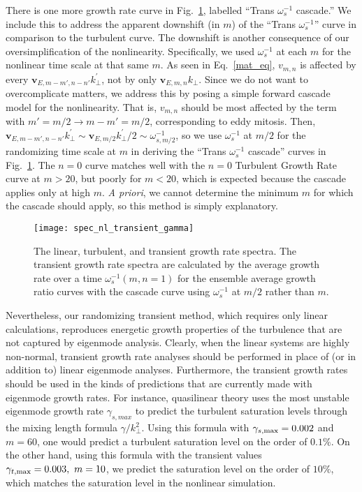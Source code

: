 \documentclass[showpacs,preprintnumbers,amsmath,amssymb,superscriptaddress,aip]{revtex4-1}
\begin{document}
There is one more growth rate curve in Fig.~\ref{spec_nl_transient_gamma}, labelled ``Trans $\omega_s^{-1}$ cascade.'' We include this to address the apparent downshift (in $m$) of
the ``Trans $\omega_s^{-1}$'' curve in comparison to the turbulent curve. The downshift is another consequence of our oversimplification of the nonlinearity. Specifically, we
used $\omega_s^{-1}$ at each $m$ for the nonlinear time scale at that same $m$. As seen in Eq.~\ref{mat_eq}, $v_{m,n}$ is affected by every $\mathbf{v}_{E,m-m',n-n'} k^{'}_\perp$, not by only
$\mathbf{v}_{E,m,n} k_\perp$. Since we do not want to overcomplicate matters, we address this by posing a simple forward cascade model for the nonlinearity. That is, $v_{m,n}$ should be
most affected by the term with $m' = m/2 \rightarrow m-m' = m/2$, corresponding to eddy mitosis. Then, $\mathbf{v}_{E,m-m',n-n'} k^{'}_\perp \sim \mathbf{v}_{E,m/2} k^{'}_\perp/2 \sim \omega_{s,m/2}^{-1}$, 
so we use $\omega_s^{-1}$ at $m/2$ for the randomizing time scale at $m$ in deriving the ``Trans $\omega_s^{-1}$ cascade'' curves in Fig.~\ref{spec_nl_transient_gamma}. 
The $n=0$ curve matches well with the $n=0$ Turbulent Growth Rate curve at $m>20$, but poorly for $m<20$, which is expected because the cascade applies only at high $m$. \emph{A priori}, we
cannot determine the minimum $m$ for which the cascade should apply, so this method is simply explanatory.

\begin{figure}
\centerline{\texttt{[image: spec\_nl\_transient\_gamma]}}
\caption{The linear, turbulent, and transient growth rate spectra. The transient growth rate spectra are calculated by the average growth rate over a time $\omega_s^{-1}(m,n=1)$ for the ensemble average
growth ratio curves with the cascade curve using $\omega_s^{-1}$ at $m/2$ rather than $m$.}
\label{spec_nl_transient_gamma}
\end{figure}

Nevertheless, our randomizing transient method, which requires only linear calculations, reproduces energetic growth properties of the turbulence that are not captured by eigenmode analysis.
Clearly, when the linear systems are highly non-normal, transient growth rate analyses should be performed in place of (or in addition to) linear eigenmode analyses. 
Furthermore, the transient growth rates should be used in the kinds of predictions that are currently made with eigenmode growth rates. 
For instance, quasilinear theory uses the most unstable eigenmode growth rate $\gamma_{s,max}$ to predict the turbulent saturation levels through the mixing length formula $\gamma/k_\perp^2$. 
Using this formula with $\gamma_{s,\rm{max}} = 0.002$ and $m=60$, one would predict a turbulent saturation level on the order of $0.1 \%$. 
On the other hand, using this formula with the transient values $\gamma_{t,\rm{max}} = 0.003, \ m=10$, we predict the saturation level on the order of $10 \%$,
which matches the saturation level in the nonlinear simulation.
\end{document}
